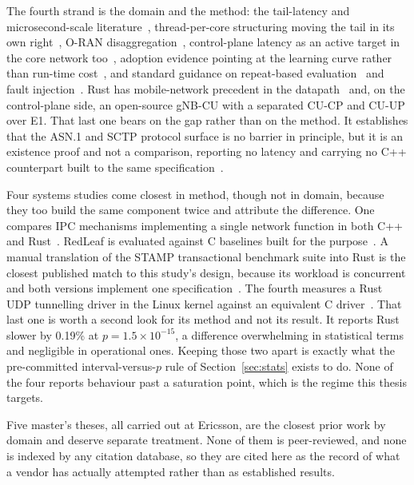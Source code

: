 \documentclass[english,twoside,openright,a4paper,censored,csm,software-track-2020]{HYthesisML}
\begin{document}
The fourth strand is the domain and the method: the tail-latency and microsecond-scale
literature~\cite{dean2013tail,barroso2017microseconds,li2014tales,huang2017predictability},
thread-per-core structuring moving the tail in its own right~\cite{enberg2019threadpercore}, O-RAN
disaggregation~\cite{polese2023oran}, control-plane latency as an active target in the core network
too~\cite{liu2023l25gc,park2025ctrlbench}, adoption evidence pointing at the learning curve rather
than run-time cost~\cite{fulton2021adopting,crichton2024learning,ardito2021verbosity}, and standard
guidance on repeat-based evaluation~\cite{georges2007rigorous} and fault
injection~\cite{natella2016fault}. Rust has mobile-network precedent in the
datapath~\cite{qazi2017pepc} and, on the control-plane side, an open-source gNB-CU with a separated
CU-CP and CU-UP over E1. That last one bears on the gap rather than on the method. It establishes
that the ASN.1 and SCTP protocol surface is no barrier in principle, but it is an existence proof
and not a comparison, reporting no latency and carrying no C++ counterpart built to the same
specification~\cite{alsoran}.

Four systems studies come closest in method, though not in domain, because they too build the
same component twice and attribute the difference. One compares IPC mechanisms implementing a
single network function in both C++ and Rust~\cite{li2021ipc}. RedLeaf is evaluated against C
baselines built for the purpose~\cite{narayanan2020redleaf}. A manual translation of the STAMP
transactional benchmark suite into Rust is the closest published match to this study's design,
because its workload is concurrent and both versions implement one
specification~\cite{suchert2023stamp}. The fourth measures a Rust UDP tunnelling driver in the
Linux kernel against an equivalent C driver~\cite{gonzalez2023rustudp}. That last one is worth a
second look for its method and not its result. It reports Rust slower by 0.19\% at
$p = 1.5 \times 10^{-15}$, a difference overwhelming in statistical terms and negligible in
operational ones. Keeping those two apart is exactly what the pre-committed
interval-versus-$p$ rule of Section~\ref{sec:stats} exists to do. None of the four reports
behaviour past a saturation point, which is the regime this thesis targets.

Five master's theses, all carried out at Ericsson, are the closest prior work by domain and
deserve separate treatment. None of them is peer-reviewed, and none is indexed by any citation
database, so they are cited here as the record of what a vendor has actually attempted rather
than as established results.
\end{document}
